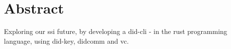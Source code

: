 \chapter*{Abstract}

Exploring our \acrfull{ssi} future, by developing a \acrfull{did-cli} - in the \gls{rust} programming language, using \gls{did-key}, \acrfull{didcomm} and \acrfull{vc}.